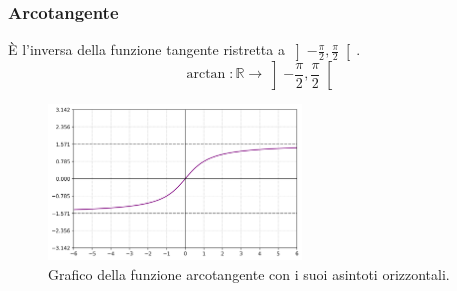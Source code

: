 \subsubsection{Arcotangente}
È l'inversa della funzione tangente ristretta a \(\left]-\frac{\pi}{2}, \frac{\pi}{2}\right[\).
\[ \arctan: \mathbb{R} \rightarrow \left]-\frac{\pi}{2}, \frac{\pi}{2}\right[ \]

\begin{figure}[H]
    \centering
    \includegraphics[width=0.6\textwidth]{./img/arcotangente.png}
    \caption{Grafico della funzione arcotangente con i suoi asintoti orizzontali.}
    \label{fig:arcotangente}
\end{figure}
\FloatBarrier
